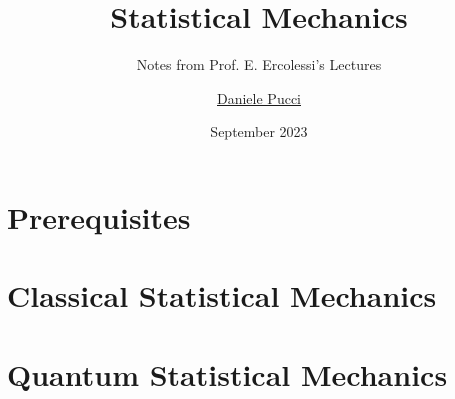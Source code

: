 \documentclass[12pt]{book}
\begin{document}
\title{Statistical Mechanics}
\subtitle{Notes from Prof. E. Ercolessi's Lectures}
\author{\href{https://github.com/puccj}{Daniele Pucci}}
\date{September 2023}

\maketitle
\tableofcontents

\chapter{Prerequisites}

\chapter{Classical Statistical Mechanics}

\chapter{Quantum Statistical Mechanics}

\end{document}
